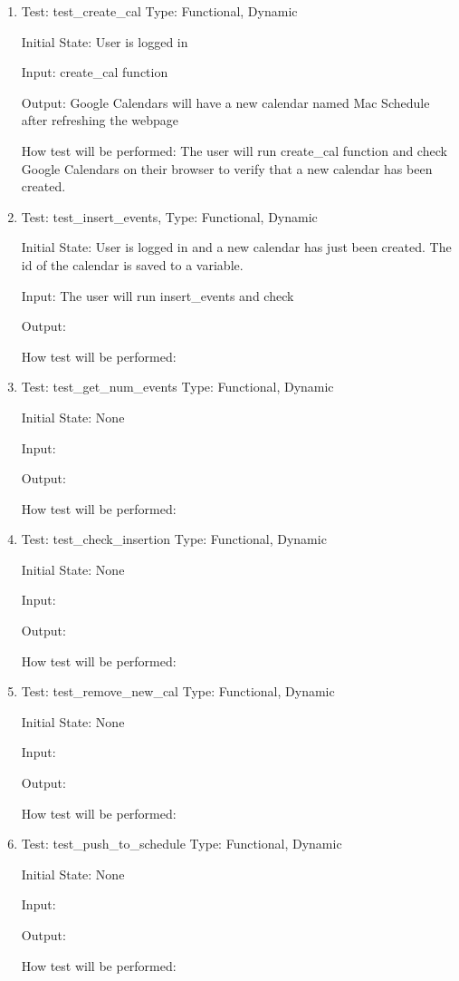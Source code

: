 \documentclass[12pt, titlepage]{article}
\begin{document}
\begin{enumerate}

\color{blue}\item{Test: test\_create_cal}
Type: Functional, Dynamic
					
Initial State: User is logged in
					
Input: create_cal function
					
Output: Google Calendars will have a new calendar named Mac Schedule after refreshing the webpage
					
How test will be performed: 
The user will run create_cal function and check Google Calendars on their browser to verify that a new calendar has been created. 

\color{blue}\item{Test: test\_insert\_events,}
Type: Functional, Dynamic
					
Initial State: User is logged in and a new calendar has just been created. The id of the calendar is saved to a variable.
					
Input: 
The user will run insert_events and check 
					
Output: 
					
How test will be performed: 
\color{blue}\item{Test: test\_get\_num\_events}
Type: Functional, Dynamic
					
Initial State: None
					
Input: 
					
Output: 
					
How test will be performed: 
\color{blue}\item{Test: test\_check\_insertion}
Type: Functional, Dynamic
					
Initial State: None
					
Input: 
					
Output: 
					
How test will be performed: 
\color{blue}\item{Test: test\_remove\_new_cal}
Type: Functional, Dynamic
					
Initial State: None
					
Input: 
					
Output: 
					
How test will be performed: 
\color{blue}\item{Test: test\_push\_to\_schedule}
Type: Functional, Dynamic
					
Initial State: None
					
Input: 
					
Output: 
					
How test will be performed: 
\color{black}

\end{enumerate}
\color{blue}
\end{document}
